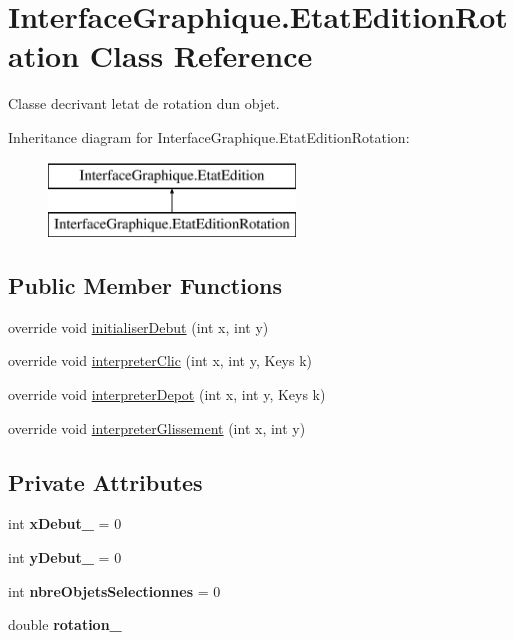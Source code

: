 \hypertarget{class_interface_graphique_1_1_etat_edition_rotation}{}\section{Interface\+Graphique.\+Etat\+Edition\+Rotation Class Reference}
\label{class_interface_graphique_1_1_etat_edition_rotation}


Classe decrivant l\textquotesingle{}etat de rotation d\textquotesingle{}un objet.  


Inheritance diagram for Interface\+Graphique.\+Etat\+Edition\+Rotation\+:\begin{figure}[H]
\begin{center}
\leavevmode
\includegraphics[height=2.000000cm]{class_interface_graphique_1_1_etat_edition_rotation}
\end{center}
\end{figure}
\subsection*{Public Member Functions}
\begin{DoxyCompactItemize}
\item 
override void \hyperlink{group__inf2990_ga6a6051304cdd5153ff8068c24ef1b6a8}{initialiser\+Debut} (int x, int y)
\item 
override void \hyperlink{group__inf2990_gad8114645cabee8c5134dbb26ec1e9705}{interpreter\+Clic} (int x, int y, Keys k)
\item 
override void \hyperlink{group__inf2990_gac99c3de472604def3a32384c864a5d63}{interpreter\+Depot} (int x, int y, Keys k)
\item 
override void \hyperlink{group__inf2990_gace97575f8172e5d90b07a1700e42211d}{interpreter\+Glissement} (int x, int y)
\end{DoxyCompactItemize}
\subsection*{Private Attributes}
\begin{DoxyCompactItemize}
\item 
int {\bfseries x\+Debut\+\_\+} = 0
\item 
int {\bfseries y\+Debut\+\_\+} = 0
\item 
int {\bfseries nbre\+Objets\+Selectionnes} = 0
\item 
double {\bfseries rotation\+\_\+}
\end{DoxyCompactItemize}
